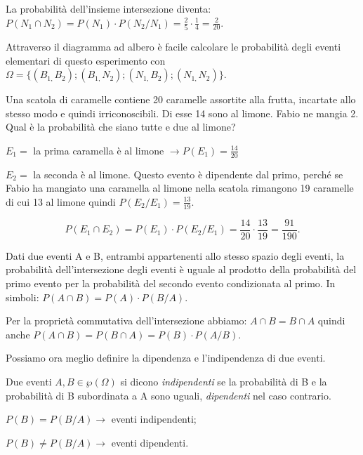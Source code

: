 \begin{exrig}
\begin{esempio}
\begin{center}
\begin{tikzpicture}[x=10mm,y=10mm,font=\small]
\end{tikzpicture}

\end{center}

La probabilità dell'insieme intersezione diventa: $P(N_1\cap N_2)=P(N_1)\cdot 
P(N_2/N_1)=\frac 2 5\cdot \frac 1 4=\frac 2{20}$.

Attraverso il diagramma ad albero è facile calcolare le probabilità degli 
eventi 
elementari di questo esperimento con $\Omega 
=\{(B_{1,}B_2);(B_{1,}N_2);(N_{1,}B_2);(N_{1,}N_2)\}$.
\end{esempio}

\begin{esempio}
Una scatola di caramelle contiene 20 caramelle assortite alla frutta, incartate 
allo stesso modo e quindi irriconoscibili. Di esse 14 sono al limone. Fabio ne 
mangia 2. Qual è la probabilità che siano tutte e due al limone?
\begin{itemize*}
\item $E_1=$ la prima caramella è al limone $\to P(E_1)=\frac{14}{20}$
\item $E_2=$ la seconda è al limone. Questo evento è dipendente dal primo, 
perché se Fabio ha mangiato una caramella al limone nella scatola rimangono 19 
caramelle di cui 13 al limone quindi $P(E_2/E_1)=\frac{13}{19}$.
\end{itemize*}
\[P(E_1\cap E_2)=P(E_1)\cdot P(E_2/E_1)=\frac{14}{20}\cdot 
\frac{13}{19}=\frac{91}{190}.\]
\end{esempio}
\end{exrig}

\begin{teorema}
Dati due eventi A e B, entrambi appartenenti allo stesso spazio degli eventi, 
la 
probabilità dell'intersezione degli eventi è uguale al prodotto della 
probabilità del primo evento per la probabilità del secondo evento condizionata 
al primo. In simboli: $P(A\cap B)=P(A)\cdot P(B/A)$.
\end{teorema}

Per la proprietà commutativa dell'intersezione abbiamo: $A\cap B=B\cap A$ 
quindi 
anche $P(A\cap B)=P(B\cap A)=P(B)\cdot P(A/B)$.

Possiamo ora meglio definire la dipendenza e l'indipendenza di due eventi.

\begin{definizione}
Due eventi $A,B\in \wp (\Omega )$ si dicono \emph{indipendenti} se la 
probabilità di B e la probabilità di B subordinata a A sono uguali, 
\emph{dipendenti} nel caso contrario.

$P(B)=P(B/A)\to$ eventi indipendenti;

 ${P}(B)\neq P(B/A)\to$ eventi dipendenti.
\end{definizione}

